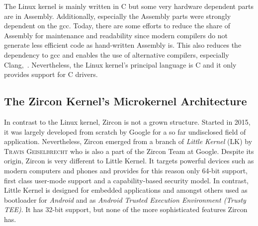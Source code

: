 The Linux kernel is mainly written in C but some very hardware dependent parts are in Assembly. 
Additionally, especially the Assembly parts were strongly dependent on the \ac{gcc}.
Today, there are some efforts to reduce the share of Assembly for maintenance and readability since modern compilers do not generate less efficient code as hand-written Assembly is\cite{programming-religion}.
This also reduces the dependency to \ac{gcc} and enables the use of alternative compilers, especially Clang\cite{linux-clang},~\cite{fosdem-linux-llvm}.
Nevertheless, the Linux kernel's principal language is C and it only provides support for C drivers. 


\subsection{The Zircon Kernel's Microkernel Architecture}
In contrast to the Linux kernel, Zircon is not a grown structure.
Started in 2015, it was largely developed from scratch by Google for a so far undisclosed field of application\cite{chat-zircon-arch}.
Nevertheless, Zircon emerged from a branch of \textit{Little Kernel} (LK) by \textsc{Travis Geiselbrecht} who is also a part of the Zircon Team at Google\cite{zircon-vs-lk}. 
Despite its origin, Zircon is very different to Little Kernel.
It targets powerful devices such as modern computers and phones and provides for this reason only 64-bit support, first class user-mode support and a capability-based security model. 
In contrast, Little Kernel is designed for embedded applications and amongst others used as bootloader for \textit{Android} and as \textit{Android Trusted Execution Environment (Trusty TEE)}\cite{lk-intro}.
It has 32-bit support, but none of the more sophisticated features Zircon has\cite{zircon-vs-lk}.

